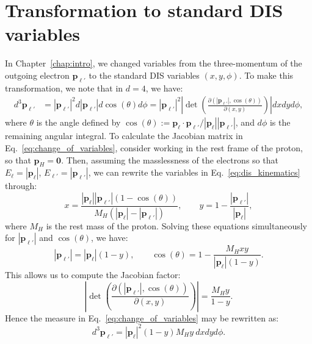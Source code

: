 \documentclass[withindex,glossary]{cam-thesis}
\renewcommand{\vec}[1]{\textbf{#1}} %
\begin{document}
%

\renewcommand{\bibname}{References}
\cleardoublepage
{}
{}






\appendix

\chapter{Transformation to standard DIS variables}
\label{app:jacobian}
In Chapter~\ref{chap:intro}, we changed variables from the three-momentum of the outgoing electron $\vec{p}_{\ell'}$ to the standard DIS variables $(x,y,\phi)$. To make this transformation, we note that in $d=4$, we have:
\begin{align}
d^{3} \vec{p}_{\ell'} &= |\vec{p}_{\ell'}|^{2} d|\vec{p}_{\ell'}| d\cos(\theta) d\phi = |\vec{p}_{\ell'}|^{2}\left|\det\left(\frac{\partial (|\vec{p}_{\ell'}|, \cos(\theta))}{\partial(x, y)}\right) \right| dx dy d\phi,
\label{eq:change_of_variables}
\end{align}
where $\theta$ is the angle defined by $\cos(\theta) := \vec{p}_{\ell} \cdot \vec{p}_{\ell'} / |\vec{p}_{\ell}| |\vec{p}_{\ell'}|$, and $d\phi$ is the remaining angular integral. To calculate the Jacobian matrix in Eq.~\eqref{eq:change_of_variables}, consider working in the rest frame of the proton, so that $\vec{p}_H = \vec{0}$. Then, assuming the masslessness of the electrons so that $E_{\ell} = |\vec{p}_{\ell}|$, $E_{\ell'} = |\vec{p}_{\ell'}|$, we can rewrite the variables in Eq.~\eqref{eq:dis_kinematics} through:
\begin{equation}
\label{eq:change_of_variables}
x = \frac{|\vec{p}_{\ell}| |\vec{p}_{\ell'}| \left(1 - \cos(\theta)\right)}{M_H (|\vec{p}_{\ell}| - |\vec{p}_{\ell'}|)}, \qquad y = 1 - \frac{|\vec{p}_{\ell'}|}{|\vec{p}_{\ell}|},
\end{equation}
where $M_H$ is the rest mass of the proton. Solving these equations simultaneously for $|\vec{p}_{\ell'}|$ and $\cos(\theta)$, we have:
\begin{equation}
|\vec{p}_{\ell'}| = |\vec{p}_{\ell}|(1-y), \qquad \cos(\theta) = 1 - \frac{M_H xy}{|\vec{p}_{\ell}|(1-y)}.
\end{equation}
This allows us to compute the Jacobian factor:
\begin{equation}
\left|\det\left(\frac{\partial (|\vec{p}_{\ell'}|, \cos(\theta))}{\partial(x, y)}\right) \right| = \frac{M_H y}{1-y}.
\end{equation}
Hence the measure in Eq.~\eqref{eq:change_of_variables} may be rewritten as:
\begin{equation}
d^{3} \vec{p}_{\ell'} =  |\vec{p}_{\ell}|^2 (1-y) M_H y \ dx dy d\phi.
\end{equation}
\end{document}
